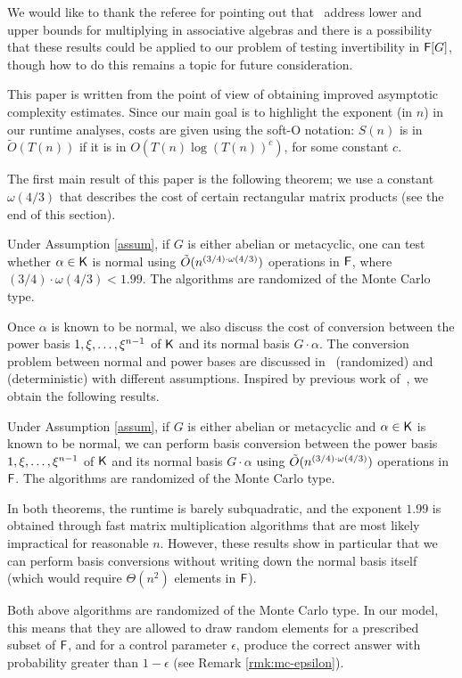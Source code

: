 We would like to thank 
the referee for pointing out that~\cite{BuClSh97} address lower and 
upper bounds for multiplying in associative algebras and there is a 
possibility that these results could be applied to our problem of 
testing invertibility in ${\mathsf{F}}[G]$, though how to do this remains a topic for
future consideration.


This paper is written from the point of view of obtaining improved
asymptotic complexity estimates. Since our main goal is to highlight
the exponent (in $n$) in our runtime analyses, costs are given using
the soft-O notation: $S(n)$ is in $\tilde{O}(T(n))$ if it is in
$O(T(n) \log(T(n))^c)$, for some constant $c$.

The first main result of this paper is the following theorem; we use a
constant $\omega(4/3)$ that describes the cost of certain rectangular
matrix products (see the end of this section).
\begin{theorem}\label{thm:main}
  Under Assumption \ref{assum}, if $G$ is either abelian or
  metacyclic, one can test whether $\alpha \in {\mathsf{K}}$ is normal using
  $\tilde{O}(n^{(3/4)\cdot \omega(4/3)})$ operations in ${\mathsf{F}}$, where
  $(3/4)\cdot\omega(4/3)<1.99$. The algorithms are randomized of the Monte Carlo type.
\end{theorem}
Once $\alpha$ is known to be normal, we also discuss the cost 
of conversion between the power basis $1,\xi,\dots,\xi^{n-1}$
of ${\mathsf{K}}$ and its normal basis $G\cdot \alpha$. The conversion problem between normal and 
power bases are discussed in~\cite{KalSho98} (randomized) and~\cite{Sergeev} 
(deterministic) with different assumptions. Inspired by
previous work of~\cite{KalSho98}, we obtain the following results.
\begin{theorem}\label{thm:main2}
  Under Assumption \ref{assum}, if $G$ is either abelian or metacyclic
  and $\alpha \in {\mathsf{K}}$ is known to be normal, we can perform basis
  conversion between the power basis $1,\xi,\dots,\xi^{n-1}$ of
  ${\mathsf{K}}$ and its normal basis $G\cdot \alpha$ using $\tilde{O}(n^{(3/4)\cdot \omega(4/3)})$
  operations in ${\mathsf{F}}$. The algorithms are randomized of the Monte Carlo type.
\end{theorem}
In both theorems, the runtime is barely subquadratic, and the exponent
$1.99$ is obtained through fast matrix multiplication algorithms that
are most likely impractical for reasonable $n$. However, these results
show in particular that we can perform basis conversions without
writing down the normal basis itself (which would require
$\Theta(n^2)$ elements in ${\mathsf{F}}$).
\begin{remark}\label{rmk:mc-prob}
  Both above algorithms are randomized of the Monte Carlo type. In our
  model, this means that they are allowed to draw random elements for a
  prescribed subset of ${\mathsf{F}}$, and for a control parameter $\epsilon$,
  produce the correct answer with probability greater than
  $1-\epsilon$ (see Remark \ref{rmk:mc-epsilon}).
\end{remark}

